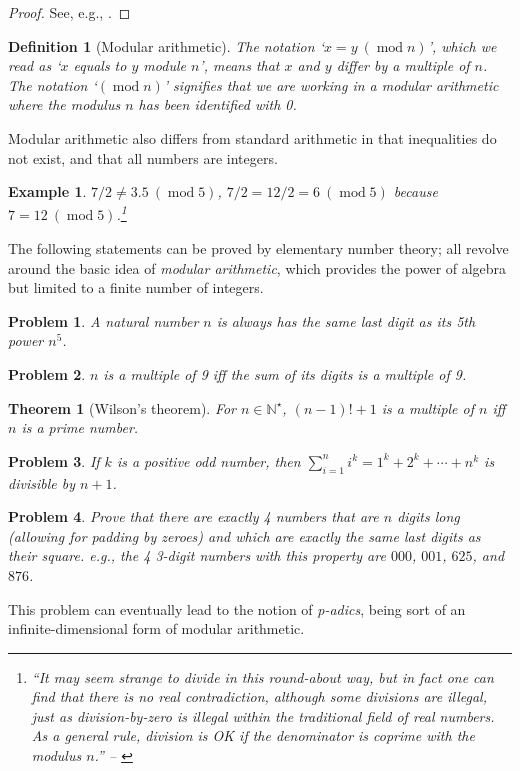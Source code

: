 \documentclass[oneside]{book}
\numberwithin{equation}{section}
\newtheorem{definition}{Definition}[section]
\newtheorem{example}{Example}[section]
\newtheorem{problem}{Problem}[section]
\newtheorem{theorem}{Theorem}[section]
\begin{document}
\begin{proof}[Proof]
	See, e.g., \cite[p. 4]{Gelca_Andreescu2017}.
\end{proof}

\begin{definition}[Modular arithmetic]
	The notation `$x = y\ (\operatorname{mod} n)$', which we read as `$x$ equals to $y$ module $n$', means that $x$ and $y$ differ by a multiple of $n$. The notation `$(\operatorname{mod} n)$' signifies that we are working in a \emph{modular arithmetic} where the \emph{modulus $n$} has been identified with 0.
\end{definition}
Modular arithmetic also differs from standard arithmetic in that inequalities do not exist, and that all numbers are integers.

\begin{example}
	$7/2\ne 3.5\ (\operatorname{mod} 5)$, $7/2 = 12/2 = 6\ (\operatorname{mod} 5)$ because $7 = 12\ (\operatorname{mod} 5)$.\footnote{``It may seem strange to divide in this round-about way, but in fact one can find that there is no real contradiction, although some divisions are illegal, just as division-by-zero is illegal within the traditional field of real numbers. As a general rule, division is OK if the denominator is coprime with the modulus $n$.'' -- \cite[p. 10]{Tao2006}}
\end{example}
The following statements can be proved by elementary number theory; all revolve around the basic idea of \textit{modular arithmetic}, which provides the power of algebra but limited to a finite number of integers.
\begin{problem}
	A natural number $n$ is always has the same last digit as its 5th power $n^5$.
\end{problem}

\begin{problem}
	$n$ is a multiple of 9 iff the sum of its digits is a multiple of 9.
\end{problem}

\begin{theorem}[Wilson's theorem]
	For $n\in\mathbb{N}^\star$, $(n - 1)! + 1$ is a multiple of $n$ iff $n$ is a prime number.
\end{theorem}

\begin{problem}
	If $k$ is a positive odd number, then $\sum_{i=1}^n i^k = 1^k + 2^k + \cdots + n^k$ is divisible by $n + 1$.
\end{problem}

\begin{problem}
	Prove that there are exactly 4 numbers that are $n$ digits long (allowing for padding by zeroes) and which are exactly the same last digits as their square. e.g., the 4 3-digit numbers with this property are $000$, $001$, $625$, and $876$.
\end{problem}
This problem can eventually lead to the notion of \textit{p-adics}, being sort of an infinite-dimensional form of modular arithmetic.
\end{document}
